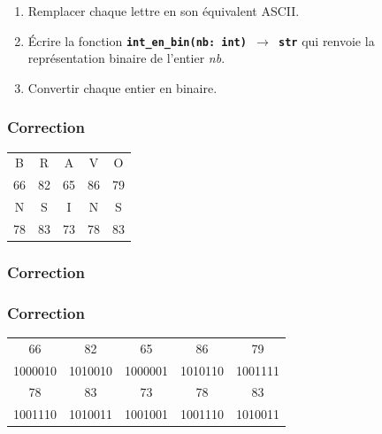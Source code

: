 \documentclass[svgnames,11pt]{beamer}
\begin{document}
\begin{frame}
    \frametitle{}

    \begin{activite}
        \begin{enumerate}
            \item Remplacer chaque lettre en son équivalent ASCII.
            \item Écrire la fonction \textbf{\texttt{int\_en\_bin(nb: int) $\rightarrow$ str}} qui renvoie la représentation binaire de l'entier \emph{nb}.
            \item Convertir chaque entier en binaire.
        \end{enumerate}
        \end{activite}
\end{frame}
\begin{frame}
    \frametitle{Correction}

    \begin{center}
        \begin{tabular}{*{5}{c}}
            B&R&A&V&O\\
            66&82&65&86&79\\
            N&S&I&N&S\\
            78&83&73&78&83\\
        \end{tabular}
    \end{center}

\end{frame}
\begin{frame}
    \frametitle{Correction}

    

\end{frame}
\begin{frame}
    \frametitle{Correction}

    \begin{center}
        \begin{tabular}{*{5}{c}}

            66&82&65&86&79\\
            1000010&1010010&1000001&1010110&1001111\\

            78&83&73&78&83\\
            1001110&1010011&1001001&1001110&1010011\\
        \end{tabular}
    \end{center}

\end{frame}
\end{document}
